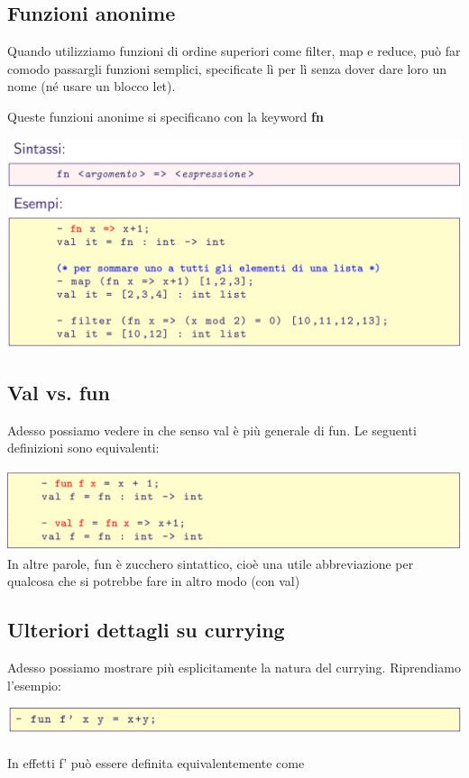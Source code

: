\documentclass[10pt]{article}
\begin{document}
\subsection{Funzioni anonime}
Quando utilizziamo funzioni di ordine superiori come filter, map e
reduce, può far comodo passargli funzioni semplici, specificate lì
per lì senza dover dare loro un nome (né usare un blocco let).

Queste funzioni anonime si specificano con la keyword \textbf{fn}

\includegraphics[scale=0.2]{Immagini/ml37.png}
\subsection{Val vs. fun}
Adesso possiamo vedere in che senso val è più generale di fun. Le
seguenti definizioni sono equivalenti:


\includegraphics[scale=0.2]{Immagini/ml38.png}
\\
In altre parole, fun è zucchero sintattico, cioè una utile abbreviazione
per qualcosa che si potrebbe fare in altro modo (con val)
\subsection{Ulteriori dettagli su currying}
Adesso possiamo mostrare più esplicitamente la natura del
currying. Riprendiamo l’esempio:

\includegraphics[scale=0.2]{Immagini/ml39.png}
\\\\
In effetti f’ può essere definita equivalentemente come
\end{document}
